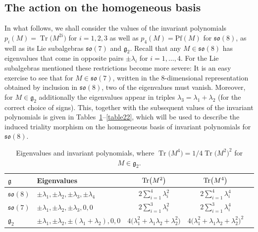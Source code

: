 \documentclass[10pt,a4paper]{amsart}
\numberwithin{equation}{section}
\newcommand{\Tr}{\operatorname{Tr}}
\begin{document}
\subsection{The action on the homogeneous basis}
In what follows, we shall consider the values of the invariant polynomials $p_i (M) = \Tr\big(M^{2i}\big)$ for $i=1,2,3$ as well as $p_4(M) = \mathrm{Pf}(M)$ for $\mathfrak{so}(8)$, as well as its Lie subalgebras $\mathfrak{so}(7)$ and $\mathfrak{g}_2$. Recall that any $M \in \mathfrak{so}(8)$ has eigenvalues that come in opposite pairs $\pm \lambda_i$ for $i=1,\dots,4$. For the Lie subalgebras mentioned these restrictions become more severe: It is an easy exercise to see that for $M \in \mathfrak{so}(7)$, written in the 8-dimensional representation obtained by inclusion in $\mathfrak{so}(8)$, two of the eigenvalues must vanish. Moreover, for $M \in \mathfrak{g}_2$ additionally the eigenvalues appear in triples $\lambda_3 = \lambda_1 + \lambda_2$ (for the correct choice of signs). This, together with the subsequent values of the invariant polynomials is given in Tables~\ref{table2}--\ref{table22}, which will be used to describe the induced triality morphism on the homogeneous basis of invariant polynomials for $\mathfrak{so}(8)$.

 \begin{table}[h]\centering\renewcommand{\arraystretch}{1.3}
\begin{tabular}{llccc}
 $\mathfrak{g}$ & Eigenvalues & ${\rm Tr}\big(M^2\big)$& ${\rm Tr}\big(M^4\big)$\\
\hline
$\mathfrak{so}(8)$ & $\pm \lambda_1,\pm \lambda_2,\pm \lambda_3,\pm \lambda_4$	&$2\sum_{i=1}^4\lambda_i^2$ &$2\sum_{i=1}^4\lambda_i^4$ \\
$\mathfrak{so}(7)$ & $\pm \lambda_1,\pm \lambda_2,\pm \lambda_3,0,0$	&$2\sum_{i=1}^3\lambda_i^2$ &$2\sum_{i=1}^3\lambda_i^4$ \\
$\mathfrak{g}_{2}$ & $\pm \lambda_1,\pm \lambda_2,\pm (\lambda_1+\lambda_2),0,0$	& $4\big(\lambda^2_1+\lambda_1\lambda_2+\lambda_2^2\big)$ & $4 \big(\lambda_1 ^2 + \lambda_1 \lambda_2 + \lambda_2^2\big)^2$ \\
\end{tabular}
\caption{Eigenvalues and invariant polynomials, where $\Tr\big(M^4\big) = 1/4 \Tr\big(M^2\big)^2 $ for $M \in \mathfrak{g_2}$.}\label{table2}
\end{table}
\end{document}
